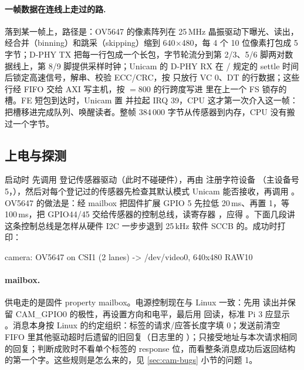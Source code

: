 \paragraph{一帧数据在连线上走过的路.} 落到某一帧上，路径是：OV5647 的像素阵列在 25\,MHz 晶振驱动下曝光、读出，经合并（binning）和跳采（skipping）缩到 640$\times$480，每 4 个 10 位像素打包成 5 字节；D-PHY TX 把每一行包成一个长包，字节轮流分到第 2/3、5/6 脚两对数据线上，第 8/9 脚提供采样时钟；Unicam 的 D-PHY RX 在 / 规定的 settle 时间后锁定高速信号，解串、校验 ECC/CRC，按  只放行 VC 0、DT  的行数据；这些行经 FIFO 交给 AXI 写主机，按 $=800$ 的行跨度写进  里在上一个 FS 锁存的槽。FE 短包到达时，Unicam 置  并拉起 IRQ 39，CPU 这才第一次介入这一帧：把槽移进完成队列、唤醒读者。整帧 384\,000 字节从传感器到内存，CPU 没有搬过一个字节。

\subsection{上电与探测}
\label{sec:cam-probe}

启动时  先调用  登记传感器驱动（此时不碰硬件），再由  注册字符设备 （主设备号 5，），然后对每个登记过的传感器先检查其默认模式 Unicam 能否接收，再调用 。OV5647 的做法是：经 mailbox 把固件扩展 GPIO 5 先拉低 20\,ms、再置 1，等 100\,ms，把 GPIO44/45 交给传感器的控制总线，读寄存器 ，应得 。下面几段讲这条控制总线是怎样从硬件 I2C 一步步退到 25\,kHz 软件 SCCB 的。成功时打印：

\begin{txtcode}
camera: OV5647 on CSI1 (2 lanes) -> /dev/video0, 640x480 RAW10
\end{txtcode}

\paragraph{mailbox.} 供电走的是固件 property mailbox。电源控制现在与 Linux  一致：先用  读出并保留 CAM\_GPIO0 的极性，再设置方向和电平，最后用  回读，标准 Pi 3 应显示 。消息本身按 Linux  的约定组织：标签的请求/应答长度字填 0；发送前清空 FIFO 里其他驱动超时后遗留的旧回复（日志里的 ）；只接受地址与本次请求相同的回复；判断成败时不看单个标签的 response 位，而看整条消息成功后返回结构的第一个字。这些规则是怎么来的，见 \ref{sec:cam-bugs} 小节的问题 1。

